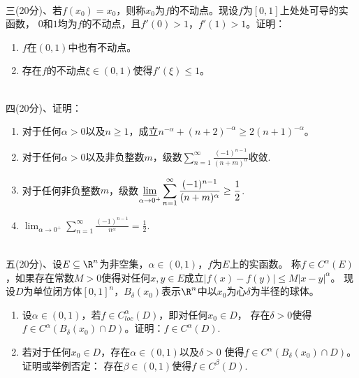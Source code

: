 ~\\
三(20分)、若$f(x_0)=x_0$，则称$x_0$为$f$的不动点。现设$f$为$[0,1]$上处处可导的实函数，
$0$和$1$均为$f$的不动点，且$f'(0)>1$，$f'(1)>1$。证明：
\begin{enumerate}[label=(\arabic*)]
\item $f$在$(0,1)$中也有不动点。
\item 存在$f$的不动点$\xi\in(0,1)$使得$f'(\xi)\le1$。
\end{enumerate}
~\\
四(20分)、证明：
\begin{enumerate}[label=(\arabic*)]
\item 对于任何$\alpha>0$以及$n\ge1$，成立$n^{-\alpha}+(n+2)^{-\alpha}\ge2(n+1)^{-\alpha}$。
\item 对于任何$\alpha>0$以及非负整数$m$，级数$\displaystyle \sum_{n=1}^\infty\frac{(-1)^{n-1}}{(n+m)^\alpha}$收敛.
\item 对于任何非负整数$m$，级数$\displaystyle \varliminf_{\alpha\to0^+}\sum_{n=1}^\infty\frac{(-1)^{n-1}}{(n+m)^\alpha}\ge\frac{1}{2}$.
\item $\displaystyle \lim_{\alpha\to0^+}\sum_{n=1}^\infty\frac{(-1)^{n-1}}{n^\alpha}=\frac{1}{2}$.
\end{enumerate}
~\\
五(20分)、设$E\subseteq\R^n$为非空集，$\alpha\in(0,1)$，$f$为$E$上的实函数。
称$f\in C^\alpha(E)$，如果存在常数$M>0$使得对任何$x,y\in E$成立$|f(x)-f(y)|\le M|x-y|^\alpha$。
现设$D$为单位闭方体$[0,1]^n$，$B_\delta(x_0)$表示$\R^n$中以$x_0$为心$\delta$为半径的球体。
\begin{enumerate}[label=(\arabic*)]
\item 设$\alpha\in(0,1)$，若$f\in C^\alpha_{loc}(D)$，即对任何$x_0\in D$，
存在$\delta>0$使得$f\in C^\alpha(B_\delta(x_0)\cap D)$。证明：$f\in C^\alpha(D)$.\\
\item 若对于任何$x_0\in D$，存在$\alpha\in(0,1)$以及$\delta>0$
使得$f\in C^\alpha(B_\delta(x_0)\cap D)$。证明或举例否定：
存在$\beta\in(0,1)$使得$f\in C^\beta(D)$.
\end{enumerate}


